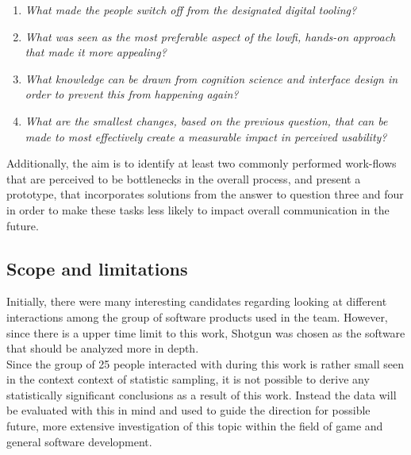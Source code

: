   \begin{enumerate}
    \item{
        \textit{
          What made the people switch off from the designated digital tooling?
        }
      }
    \item{
        \textit{
          What was seen as the most preferable aspect of the lowfi, hands-on
          approach that made it more appealing?
        }
      }
    \item{
        \textit{
          What knowledge can be drawn from cognition science and interface
          design in order to prevent this from happening again?
        }
      }
    \item{
        \textit{
          What are the smallest changes, based on the previous question, that
          can be made to most effectively create a measurable impact in
          perceived usability?
        }
      }
  \end{enumerate}

  Additionally, the aim is to identify at least two commonly performed
  work-flows that are perceived to be bottlenecks in the overall process, and
  present a prototype, that incorporates solutions from the answer to question
  three and four in order to make these tasks less likely to impact
  overall communication in the future.

  \newpage

%
%

\subsection{Scope and limitations}


  Initially, there were many interesting candidates regarding looking at
  different interactions among the group of software products used in the team.
  However, since there is a upper time limit to this work,
  Shotgun\cite{c_product_shotgun} was chosen as the software that should be
  analyzed more in depth. \\

  Since the group of 25 people interacted with during this work is rather small
  seen in the context context of statistic sampling, it is not possible to
  derive any statistically significant conclusions as a result of this work.
  Instead the data will be evaluated with this in mind and used to guide the
  direction for possible future, more extensive investigation of this topic
  within the field of game and general software development.\\



